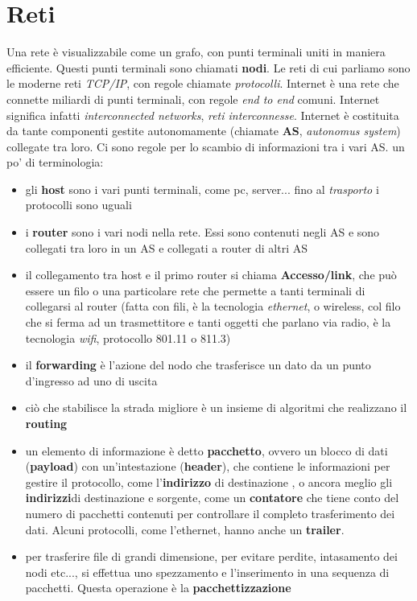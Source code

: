 \documentclass[a4paper,12pt, oneside]{book}
\begin{document}
\section{Reti}
Una rete è visualizzabile come un grafo, con punti terminali uniti in maniera efficiente. Questi punti terminali sono chiamati \textbf{nodi}. Le reti di cui parliamo sono le moderne reti \textit{TCP/IP}, con regole chiamate \textit{protocolli}. Internet è una rete che connette miliardi di punti terminali, con regole \textit{end to end} comuni. Internet significa infatti \textit{interconnected networks}, \textit{reti interconnesse}. Internet è costituita da tante componenti gestite autonomamente (chiamate \textbf{AS}, \textit{autonomus system}) collegate tra loro. Ci sono regole per lo scambio di informazioni tra i vari AS. un po' di terminologia:
\begin{itemize}
\item gli \textbf{host} sono i vari punti terminali, come pc, server... fino al \textit{trasporto} i protocolli sono uguali
\item i \textbf{router} sono i vari nodi nella rete. Essi sono contenuti negli AS e sono collegati tra loro in un AS e collegati a router di altri AS
\item il collegamento tra host e il primo router si chiama \textbf{Accesso/link}, che può essere un filo o una particolare rete che permette a tanti terminali di collegarsi al router (fatta con fili, è la tecnologia \textit{ethernet}, o wireless, col filo che si ferma ad un trasmettitore e tanti oggetti che parlano via radio, è la tecnologia \textit{wifi}, protocollo 801.11 o 811.3)
\item il \textbf{forwarding} è l'azione del nodo che trasferisce un dato da un punto d'ingresso ad uno di uscita 
\item ciò che stabilisce la strada migliore è un insieme di algoritmi che realizzano il \textbf{routing}
\item un elemento di informazione è detto \textbf{pacchetto}, ovvero un blocco di dati (\textbf{payload}) con un'intestazione (\textbf{header}), che contiene le informazioni per gestire il protocollo, come l'\textbf{indirizzo} di destinazione , o ancora meglio gli \textbf{indirizzi}di destinazione e sorgente, come un \textbf{contatore} che tiene conto del numero di pacchetti contenuti per controllare il completo trasferimento dei dati. Alcuni protocolli, come l'ethernet, hanno anche un \textbf{trailer}.
\item per trasferire file di grandi dimensione, per evitare perdite, intasamento dei nodi etc..., si effettua uno spezzamento e l'inserimento in una sequenza di pacchetti. Questa operazione è la \textbf{pacchettizzazione}

\end{itemize}
\end{document}
